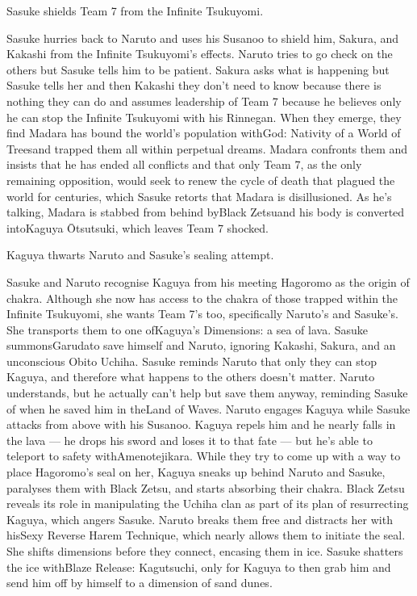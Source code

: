 \documentclass[a4paper,12pt]{article}
\begin{document}
Sasuke shields Team 7 from the Infinite Tsukuyomi.\\ \par \vspace{0.5cm}

Sasuke hurries back to Naruto and uses his Susanoo to shield him, Sakura, and Kakashi from the Infinite Tsukuyomi's effects. Naruto tries to go check on the others but Sasuke tells him to be patient. Sakura asks what is happening but Sasuke tells her and then Kakashi they don't need to know because there is nothing they can do and assumes leadership of Team 7 because he believes only he can stop the Infinite Tsukuyomi with his Rinnegan. When they emerge, they find Madara has bound the world's population withGod: Nativity of a World of Treesand trapped them all within perpetual dreams. Madara confronts them and insists that he has ended all conflicts and that only Team 7, as the only remaining opposition, would seek to renew the cycle of death that plagued the world for centuries, which Sasuke retorts that Madara is disillusioned. As he's talking, Madara is stabbed from behind byBlack Zetsuand his body is converted intoKaguya Ōtsutsuki, which leaves Team 7 shocked.\\ \par \vspace{0.5cm}

Kaguya thwarts Naruto and Sasuke's sealing attempt.\\ \par \vspace{0.5cm}

Sasuke and Naruto recognise Kaguya from his meeting Hagoromo as the origin of chakra. Although she now has access to the chakra of those trapped within the Infinite Tsukuyomi, she wants Team 7's too, specifically Naruto's and Sasuke's. She transports them to one ofKaguya's Dimensions: a sea of lava. Sasuke summonsGarudato save himself and Naruto, ignoring Kakashi, Sakura, and an unconscious Obito Uchiha. Sasuke reminds Naruto that only they can stop Kaguya, and therefore what happens to the others doesn't matter. Naruto understands, but he actually can't help but save them anyway, reminding Sasuke of when he saved him in theLand of Waves. Naruto engages Kaguya while Sasuke attacks from above with his Susanoo. Kaguya repels him and he nearly falls in the lava — he drops his sword and loses it to that fate — but he's able to teleport to safety withAmenotejikara. While they try to come up with a way to place Hagoromo's seal on her, Kaguya sneaks up behind Naruto and Sasuke, paralyses them with Black Zetsu, and starts absorbing their chakra. Black Zetsu reveals its role in manipulating the Uchiha clan as part of its plan of resurrecting Kaguya, which angers Sasuke. Naruto breaks them free and distracts her with hisSexy Reverse Harem Technique, which nearly allows them to initiate the seal. She shifts dimensions before they connect, encasing them in ice. Sasuke shatters the ice withBlaze Release: Kagutsuchi, only for Kaguya to then grab him and send him off by himself to a dimension of sand dunes.\\ \par \vspace{0.5cm}
\end{document}
